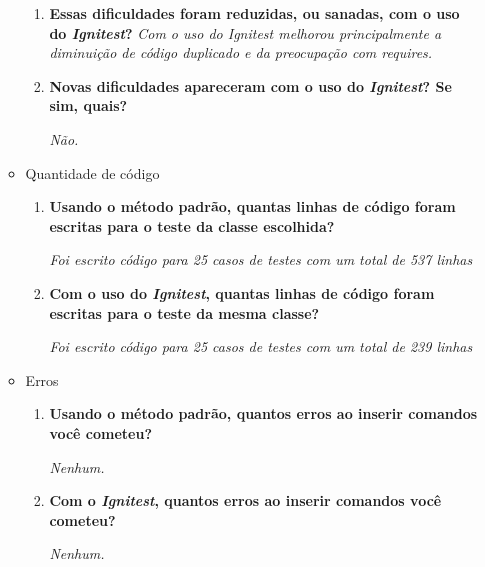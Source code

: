 \begin{itemize}
\begin{itemize}
\begin{enumerate}
                        \item \textbf{Essas dificuldades foram reduzidas, ou sanadas, com o uso do \textit{Ignitest}?}
                            \subitem \textit{Com o uso do Ignitest melhorou principalmente a diminuição de código duplicado e da preocupação com requires.} 
                        
              
                        \item \textbf{Novas dificuldades apareceram com o uso do \textit{Ignitest}? Se sim, quais?}
                        
                            \subitem \textit{Não.}
        
                    \end{enumerate}
                \item Quantidade de código
                    \begin{enumerate}
                        \item \textbf{Usando o método padrão, quantas linhas de código foram escritas para o teste da classe escolhida?}
              
                            \subitem \textit{Foi escrito código para 25 casos de testes com um total de 537 linhas}

              
                        \item \textbf{Com o uso do \textit{Ignitest}, quantas linhas de código foram escritas para o teste da mesma classe?}
              
                            \subitem \textit{Foi escrito código para 25 casos de testes com um total de 239 linhas}
              
                    \end{enumerate}

                \item Erros
                    \begin{enumerate}
                        \item \textbf{Usando o método padrão, quantos erros ao inserir comandos você cometeu?}
                        
                        \subitem \textit{Nenhum.}
                        
              
                        \item \textbf{Com o \textit{Ignitest}, quantos erros ao inserir comandos você cometeu?}
              
                        \subitem \textit{Nenhum.}
                        

\end{enumerate}
\end{itemize}
\end{itemize}
